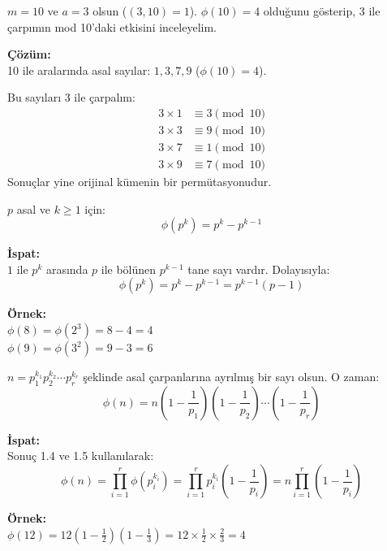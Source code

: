 \vspace{2em}

\begin{tcolorbox}[colback=blue!5, colframe=blue!40!black, title=\textbf{Örnek 1.22: Mod 10'da Euler Fonksiyonu}, fonttitle=\bfseries, sharp corners]
$m = 10$ ve $a = 3$ olsun ($(3,10)=1$). $\phi(10)=4$ olduğunu gösterip, 3 ile çarpımın mod 10'daki etkisini inceleyelim.

\textbf{Çözüm:}\\
10 ile aralarında asal sayılar: $1,3,7,9$ ($\phi(10)=4$).

Bu sayıları 3 ile çarpalım:
\begin{align*}
3\times1 &\equiv3 \pmod{10} \\
3\times3 &\equiv9 \pmod{10} \\
3\times7 &\equiv1 \pmod{10} \\
3\times9 &\equiv7 \pmod{10}
\end{align*}
Sonuçlar yine orijinal kümenin bir permütasyonudur.
\end{tcolorbox}

\vspace{2em}

\begin{tcolorbox}[colback=orange!5, colframe=orange!50!black, title=\textbf{Sonuç 1.5: Euler Fonksiyonu ve Asal Kuvvetler}, fonttitle=\bfseries, sharp corners]
$p$ asal ve $k \geq 1$ için:
\[
\phi(p^k) = p^k - p^{k-1}
\]

\textbf{İspat:}\\
$1$ ile $p^k$ arasında $p$ ile bölünen $p^{k-1}$ tane sayı vardır. Dolayısıyla:
\[
\phi(p^k) = p^k - p^{k-1} = p^{k-1}(p-1)
\]

\textbf{\"Ornek:}\\
$\phi(8) = \phi(2^3) = 8-4 = 4$ \\
$\phi(9) = \phi(3^2) = 9-3 = 6$
\end{tcolorbox}

\vspace{2em}

\begin{tcolorbox}[colback=green!5, colframe=green!40!black, title=\textbf{Teorem 1.14: Euler Fonksiyonu Formülü}, fonttitle=\bfseries, sharp corners]
$n = p_1^{k_1}p_2^{k_2}\cdots p_r^{k_r}$ şeklinde asal çarpanlarına ayrılmış bir sayı olsun. O zaman:
\[
\phi(n) = n\left(1-\frac{1}{p_1}\right)\left(1-\frac{1}{p_2}\right)\cdots\left(1-\frac{1}{p_r}\right)
\]

\textbf{İspat:}\\
Sonuç 1.4 ve 1.5 kullanılarak:
\[
\phi(n) = \prod_{i=1}^r \phi(p_i^{k_i}) = \prod_{i=1}^r p_i^{k_i}\left(1-\frac{1}{p_i}\right) = n\prod_{i=1}^r \left(1-\frac{1}{p_i}\right)
\]

\textbf{\"Ornek:}\\
$\phi(12) = 12\left(1-\frac{1}{2}\right)\left(1-\frac{1}{3}\right) = 12\times\frac{1}{2}\times\frac{2}{3} = 4$
\end{tcolorbox}

